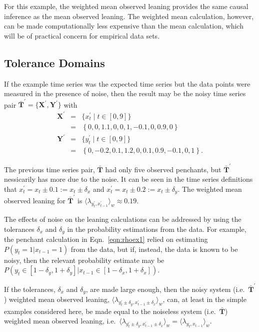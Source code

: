 \documentclass[a4paper,11pt,twocolumn]{article}
\begin{document}
For this example, the weighted mean observed leaning provides the same causal inference as the mean observed leaning.  The weighted mean calculation, however, can be made computationally less expensive than the mean calculation, which will be of practical concern for empirical data sets.

\subsection{Tolerance Domains}
If the example time series was the expected time series but the data points were measured in the presence of noise, then the result may be the noisy time series pair $\bar{\mathbf{T}}^\prime=\{\mathbf{X}^\prime,\mathbf{Y}^\prime\}$ with
\begin{eqnarray*}
\mathbf{X}^\prime &=& \{x_t^\prime\; | \; t\in[0,9]\}\\
&=& \left\{0,0,1.1,0,0,1,-0.1,0,0.9,0\right\}\\
\mathbf{Y}^\prime &=& \{y_t^\prime\; | \; t\in[0,9]\}\\
&=& \left\{0,-0.2,0.1,1.2,0,0.1,0.9,-0.1,0,1\right\}.
\end{eqnarray*}

The previous time series pair, $\bar{\mathbf{T}}$ had only five observed penchants, but $\bar{\mathbf{T}}^\prime$ nessicarily has more due to the noise.  It can be seen in the time series definitions that $x_t^\prime = x_t \pm 0.1 := x_t \pm \delta_x$ and $x_t^\prime = x_t \pm 0.2 := x_t \pm \delta_y$.  The weighted mean observed leaning for $\bar{\mathbf{T}}^\prime$ is $\langle \lambda_{y_t^\prime,x_{t-1}^\prime} \rangle_w \approx 0.19$. 

The effects of noise on the leaning calculations can be addressed by using the tolerances $\delta_x$ and $\delta_y$ in the probability estimations from the data.  For example, the penchant calculation in Eqn.\ \ref{eqn:rhoex1} relied on estimating $P(y_t=1|x_{t-1}=1)$ from the data, but if, instead, the data is known to be noisy, then the relevant probability estimate may be $P(y_t\in[1-\delta_y,1+\delta_y]|x_{t-1}\in[1-\delta_x,1+\delta_x])$.  

If the tolerances, $\delta_x$ and $\delta_y$, are made large enough, then the noisy system (i.e.\ $\bar{\mathbf{T}}^\prime$) weighted mean observed leaning, $\langle \lambda_{y_t^\prime\pm\delta_y,x_{t-1}^\prime\pm\delta_x} \rangle_w$, can, at least in the simple examples considered here, be made equal to the noiseless system (i.e.\ $\bar{\mathbf{T}}$) weighted mean observed leaning, i.e.\ $\langle \lambda_{y_t^\prime\pm\delta_y,x_{t-1}^\prime\pm\delta_x} \rangle_w = \langle \lambda_{y_t,x_{t-1}} \rangle_w$.
\end{document}
